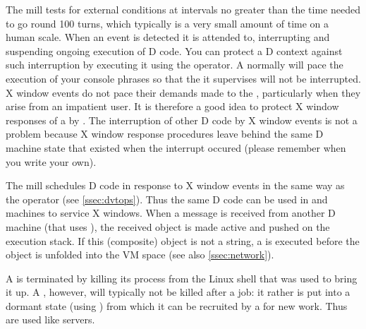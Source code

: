 The  mill tests for external conditions at intervals no
greater than the time needed to go round 100 turns, which typically is
a very small amount of time on a human scale. When an event is
detected it is attended to, interrupting and suspending ongoing
execution of D code.  You can protect a D context against such
interruption by executing it using the  operator. A
 normally will pace the execution of your console phrases
so that the  it supervises will not be
interrupted. X window events do not pace their demands made to the
, particularly when they arise from an impatient user. It
is therefore a good idea to protect X window responses of a
 by . The interruption of other D code by X
window events is not a problem because X window response procedures
leave behind the same D machine state that existed when the interrupt
occured (please remember when you write your own).

The  mill schedules D code in response to X window events
in the same way as the  operator  (see
\ref{ssec:dvtops}). Thus the same D code can be used in 
and  machines to service X windows. When a message is
received from another D machine (that uses ), the received
object is made active and pushed on the execution stack. If this
(composite) object is not a string, a  is executed before
the object is unfolded into the VM space (see also
\ref{ssec:network}).

A  is terminated by killing its process from the Linux
shell that was used to bring it up. A , however, will
typically not be killed after a job: it rather is put into a dormant
state (using ) from which it can be recruited by a
 for new work. Thus  are used like
servers.

